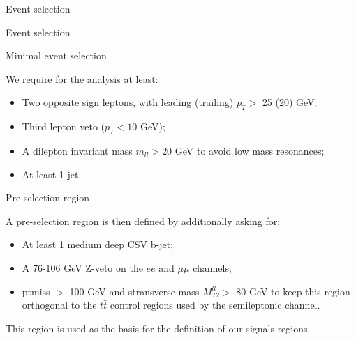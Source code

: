 \documentclass[8pt]{beamer}
\begin{document}
\begin{frame}[standout]
Event selection
\end{frame}

\begin{frame}{Event selection}
\justifying
\vspace{5pt}
\begin{block}{\centering Minimal event selection}\end{block} \vfill
\vspace{-5pt}

We require for the analysis at least:
\begin{itemize}
\item Two opposite sign leptons, with leading (trailing) $p_T >$ 25 (20) GeV;
\item Third lepton veto ($p_T < 10$ GeV);
\item A dilepton invariant mass $m_{ll} > 20$ GeV to avoid low mass resonances;
\item At least 1 jet.
\end{itemize} \vfill

\vspace{5pt}
\begin{block}{\centering Pre-selection region}\end{block} \vfill
\vspace{-5pt}

A pre-selection region is then defined by additionally asking for:
\begin{itemize}
\item At least 1 medium deep CSV b-jet;
\item A 76-106 GeV Z-veto on the $ee$ and $\mu \mu$ channels;
\item ptmiss $>$ 100 GeV and stransverse mass $M_{T2}^{ll} >$ 80 GeV to keep this region orthogonal to the $t \bar t$ control regions used by the semileptonic channel.
\end{itemize} \vfill

This region is used as the \alert{basis for the definition of our signals regions}. \vfill
\end{frame}
\end{document}
